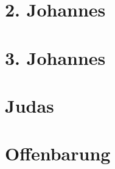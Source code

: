 \chapter{2. Johannes}
\begin{multicols}{2}
  \raggedcolumns
  \parskip=0pt \relax
  
\end{multicols}

\chapter{3. Johannes}
\begin{multicols}{2}
  \raggedcolumns
  \parskip=0pt \relax
  
\end{multicols}

\chapter{Judas}
\begin{multicols}{2}
  \raggedcolumns
  \parskip=0pt \relax
  
\end{multicols}

\chapter{Offenbarung}
\begin{multicols}{2}
  \raggedcolumns
  \parskip=0pt \relax
  
\end{multicols}
\newpage





















